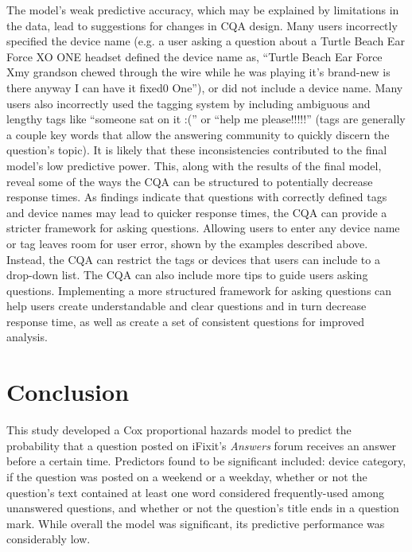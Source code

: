 \documentclass[preprint]{elsarticle}\usepackage[]{graphicx}\usepackage[]{color}
\begin{document}
The model's weak predictive accuracy, which may be explained by limitations in the data, lead to suggestions for changes in CQA design. Many users incorrectly specified the device name (e.g. a user asking a question about a Turtle Beach Ear Force XO ONE headset defined the device name as, ``Turtle Beach Ear Force Xmy grandson chewed through the wire while he was playing it's brand-new is there anyway I can have it fixed0 One''), or did not include a device name. Many users also incorrectly used the tagging system by including ambiguous and lengthy tags like ``someone sat on it :('' or ``help me please!!!!!'' (tags are generally a couple key words that allow the answering community to quickly discern the question's topic). It is likely that these inconsistencies contributed to the final model's low predictive power. This, along with the results of the final model, reveal some of the ways the CQA can be structured to potentially decrease response times. As findings indicate that questions with correctly defined tags and device names may lead to quicker response times, the CQA can provide a stricter framework for asking questions. Allowing users to enter any device name or tag leaves room for user error, shown by the examples described above. Instead, the CQA can restrict the tags or devices that users can include to a drop-down list. The CQA can also include more tips to guide users asking questions. Implementing a more structured framework for asking questions can help users create understandable and clear questions and in turn decrease response time, as well as create a set of consistent questions for improved analysis. 


\section{Conclusion}

This study developed a Cox proportional hazards model to predict the probability that a question posted on iFixit's \textit{Answers} forum receives an answer before a certain time. Predictors found to be significant included: device category, if the question was posted on a weekend or a weekday, whether or not the question's text contained at least one word considered frequently-used among unanswered questions, and whether or not the question's title ends in a question mark. While overall the model was significant, its predictive performance was considerably low. 
\end{document}
